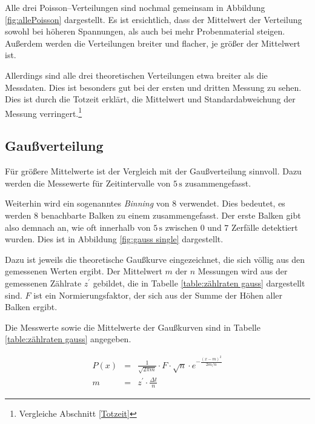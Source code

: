 \documentclass[12pt,a4paper]{scrartcl}
\numberwithin{equation}{section} %
\renewcommand{\[}{} %
\renewcommand{\]}{\noindent} %
\begin{document}
Alle drei Poisson--Verteilungen sind nochmal gemeinsam in Abbildung \ref{fig:allePoisson} dargestellt. Es ist ersichtlich, dass der Mittelwert der Verteilung sowohl bei höheren Spannungen, als auch bei mehr Probenmaterial steigen. Außerdem werden die Verteilungen breiter und flacher, je größer der Mittelwert ist.

Allerdings sind alle drei theoretischen Verteilungen etwa breiter als die Messdaten. Dies ist besonders gut bei der ersten und dritten Messung zu sehen. Dies ist durch die Totzeit erklärt, die Mittelwert und Standardabweichung der Messung verringert.\footnote{Vergleiche Abschnitt \ref{Totzeit}}

\newpage
\hypertarget{gauuxdfverteilung}{%
\subsection{Gaußverteilung}\label{gauuxdfverteilung}}
Für größere Mittelwerte ist der Vergleich mit der Gaußverteilung sinnvoll. Dazu werden die Messewerte für Zeitintervalle von $5 \mathrm{\,s}$ zusammengefasst.

Weiterhin wird ein sogenanntes \textit{Binning} von $8$ verwendet. Dies bedeutet, es werden $8$ benachbarte Balken zu einem zusammengefasst. Der erste Balken gibt also demnach an, wie oft innerhalb von $5 \mathrm{\, s}$ zwischen $0$ und $7$ Zerfälle detektiert wurden. Dies ist in Abbildung \ref{fig:gauss single} dargestellt.

Dazu ist jeweils die theoretische Gaußkurve eingezeichnet, die sich völlig aus den gemessenen Werten ergibt. Der Mittelwert $m$ der $n$ Messungen wird aus der gemessenen Zählrate $z^\prime$ gebildet, die in Tabelle \ref{table:zählraten gauss} dargestellt sind. $F$ ist ein Normierungsfaktor, der sich aus der Summe der Höhen aller Balken ergibt.

Die Messwerte sowie die Mittelwerte der Gaußkurven sind in Tabelle \ref{table:zählraten gauss} angegeben.

\begin{eqnarray}
	P(x) &=& \frac{1}{\sqrt{2 \pi m}} \cdot F \cdot \sqrt{n} \cdot e^{- \frac{(x-m)^2}{2m/n}} \\
	m &=& z^\prime \cdot \frac{\Delta t}{n}
\end{eqnarray}
\end{document}
